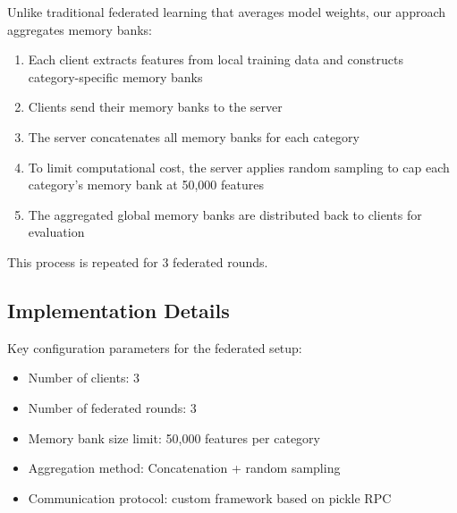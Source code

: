 \documentclass{article}
\begin{document}
Unlike traditional federated learning that averages model weights, our approach aggregates memory banks:

\begin{enumerate}
    \item Each client extracts features from local training data and constructs category-specific memory banks
    \item Clients send their memory banks to the server
    \item The server concatenates all memory banks for each category
    \item To limit computational cost, the server applies random sampling to cap each category's memory bank at 50,000 features
    \item The aggregated global memory banks are distributed back to clients for evaluation
\end{enumerate}

This process is repeated for 3 federated rounds.

\subsection{Implementation Details}

Key configuration parameters for the federated setup:

\begin{itemize}
    \item Number of clients: 3
    \item Number of federated rounds: 3
    \item Memory bank size limit: 50,000 features per category
    \item Aggregation method: Concatenation + random sampling
    \item Communication protocol: custom framework based on pickle RPC
\end{itemize}
\end{document}
